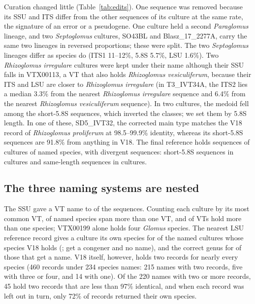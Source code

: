 \documentclass[11pt]{article}
\newcommand{\spn}[1]{\emph{#1}}   %
\begin{document}
Curation changed little (Table~\ref{tab:edits}). One sequence was removed because its SSU and ITS differ from the
other sequences of its culture at the same rate, the signature of an error or a pseudogene. One culture held a
second \spn{Paraglomus} lineage, and two \spn{Septoglomus} cultures, SO43BL and Blasz\_17\_2277A, carry the same two
lineages in reversed proportions; these were split. The two \spn{Septoglomus} lineages differ as species do (ITS1
11--12\%, 5.8S 5.7\%, LSU 1.6\%). Two \spn{Rhizoglomus irregulare} cultures were kept under their name although their
SSU falls in VTX00113, a VT that also holds \spn{Rhizoglomus vesiculiferum}, because their ITS and LSU are closer to
\spn{Rhizoglomus irregulare} (in T3\_IVT34A, the ITS2 lies a median 3.3\% from the nearest \spn{Rhizoglomus
irregulare} sequence and 6.4\% from the nearest \spn{Rhizoglomus vesiculiferum} sequence). In two cultures, the
medoid fell among the short-5.8S sequences, which inverted the classes; we set them by 5.8S length. In one of these,
SD5\_IVT32, the corrected main type matches the V18 record of \spn{Rhizoglomus proliferum} at 98.5--99.9\% identity,
whereas its short-5.8S sequences are 91.8\% from anything in V18. The final reference holds \NCopiesRetained{}
sequences of \NCultures{} cultures of \NSpecies{} named species, with \NDivergent{} divergent sequences:
\NShort{} short-5.8S sequences in \NShortCultures{} cultures and \NSameLen{} same-length sequences in
\SameLenCultures{} cultures.

\subsection{The three naming systems are nested}\label{sec:nest}
The SSU gave a VT name to \VTAssigned{} of the \NCopiesRetained{} sequences. Counting each culture by its most common
VT, \VTSpeciesMulti{} of \VTSpeciesN{} named species span more than one VT, and \VTUnitsMulti{} of \VTUnitsN{} VTs
hold more than one species; VTX00199 alone holds four \spn{Glomus} species. The nearest LSU reference record gives a
culture its own species for \LSUOwnSpecies{} of the \LSUOwnDenom{} named cultures whose species V18 holds
(\LSUOwnPct{}; \LSUCongener{} get a congener and \LSUNoCall{} no name), and the correct genus for \LSUGenusRight{}
of those that get a name. V18 itself, however, holds two records for nearly every species (460 records under 234
species names: 215 names with two records, five with three or four, and 14 with one). Of the 220 names with two or
more records, 45 hold two records that are less than 97\% identical, and when each record was left out in turn,
only 72\% of records returned their own species.
\end{document}
